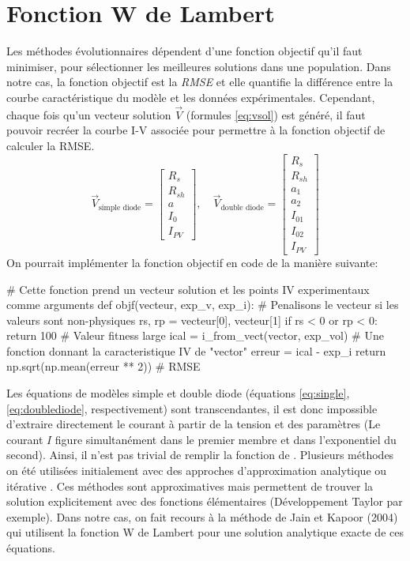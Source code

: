 \section{Fonction W de Lambert}
Les méthodes évolutionnaires dépendent d'une fonction objectif qu'il faut minimiser, pour sélectionner les meilleures solutions dans une population. Dans notre cas, la fonction objectif est la \textit{RMSE} et elle quantifie la différence entre la courbe caractéristique du modèle et les données expérimentales. Cependant, chaque fois qu'un vecteur solution $\vec{V}$ (formules \ref{eq:vsol}) est généré, il faut pouvoir recréer la courbe I-V associée pour permettre à la fonction objectif de calculer la RMSE.
\begin{equation}
  \label{eq:vsol}
  \vec{V}_{\text{simple diode}} = 
  \begin{bmatrix}
    R_s\\
    R_{sh}\\
    a\\
    I_0\\
    I_{PV}
  \end{bmatrix},
  \quad
  \vec{V}_{\text{double diode}} = 
  \begin{bmatrix}
    R_s\\
    R_{sh}\\
    a_1\\
    a_2\\
    I_{01}\\
    I_{02}\\
    I_{PV}
  \end{bmatrix}
\end{equation}
On pourrait implémenter la fonction objectif en code de la manière suivante:
\begin{python}
# Cette fonction prend un vecteur solution et les points IV experimentaux comme arguments
def objf(vecteur, exp_v, exp_i):
    # Penalisons le vecteur si les valeurs sont non-physiques
    rs, rp = vecteur[0], vecteur[1]
    if rs < 0 or rp < 0:
        return 100 # Valeur fitness large
    ical = i_from_vect(vector, exp_vol) # Une fonction donnant la caracteristique IV de "vector"
    erreur = ical - exp_i
    return np.sqrt(np.mean(erreur ** 2)) # RMSE  
\end{python}

Les équations de modèles simple et double diode (équations \ref{eq:single}, \ref{eq:doublediode}, respectivement) sont transcendantes, il est donc impossible d'extraire directement le courant à partir de la tension et des paramètres (Le courant $I$ figure simultanément dans le premier membre et dans l'exponentiel du second). Ainsi, il n'est pas trivial de remplir la fonction de . Plusieurs méthodes on été utilisées initialement avec des approches d'approximation analytique ou itérative \cite{Shur1991,AbuelmaAtti1992,Datta1992}. Ces méthodes sont approximatives mais permettent de trouver la solution explicitement avec des fonctions élémentaires (Développement Taylor par exemple). Dans notre cas, on fait recours à la méthode de Jain et Kapoor (2004) \cite{Jain2004, Lun2015} qui utilisent la fonction W de Lambert pour une solution analytique exacte de ces équations.

